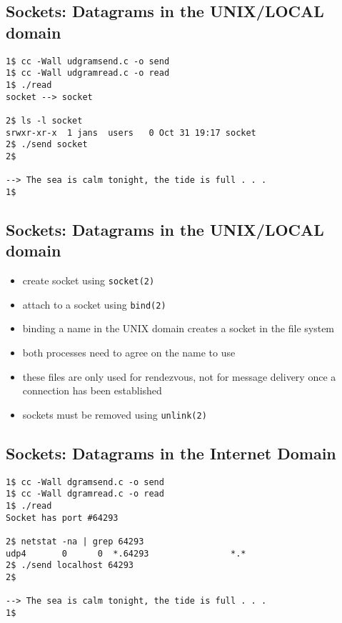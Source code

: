 \documentclass[xga]{xdvislides}
\begin{document}
\subsection{Sockets: Datagrams in the UNIX/LOCAL domain}
\begin{verbatim}
1$ cc -Wall udgramsend.c -o send
1$ cc -Wall udgramread.c -o read
1$ ./read
socket --> socket

2$ ls -l socket
srwxr-xr-x  1 jans  users   0 Oct 31 19:17 socket
2$ ./send socket
2$

--> The sea is calm tonight, the tide is full . . .
1$
\end{verbatim}
\vfill


\subsection{Sockets: Datagrams in the UNIX/LOCAL domain}
\begin{itemize}
	\item create socket using {\tt socket(2)}
	\item attach to a socket using {\tt bind(2)}
	\item binding a name in the UNIX domain creates a socket in the file system
	\item both processes need to agree on the name to use
	\item these files are only used for rendezvous, not for message delivery
		once a connection has been established
	\item sockets must be removed using {\tt unlink(2)}
\end{itemize}

\subsection{Sockets: Datagrams in the Internet Domain}
\begin{verbatim}
1$ cc -Wall dgramsend.c -o send
1$ cc -Wall dgramread.c -o read
1$ ./read
Socket has port #64293

2$ netstat -na | grep 64293
udp4       0      0  *.64293                *.*
2$ ./send localhost 64293
2$

--> The sea is calm tonight, the tide is full . . .
1$
\end{verbatim}
\vfill
\end{document}
